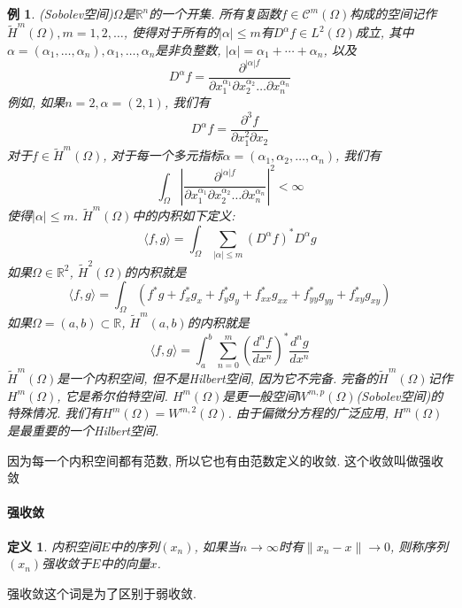 \documentclass[a4paper,11pt]{article}
\newtheorem{definition}{\hspace{2em}定义}[section]
\newtheorem{example}{例}[section]
\begin{document}
\begin{example}
  (Sobolev空间)$\Omega$是$\mathbb{R}^n$的一个开集. 所有复函数$f\in\mathcal{C}^m(\Omega)$构成的空间记作$\tilde{H}^m(\Omega),m=1,2,\dots$, 使得对于所有的$|\alpha|\leq m$有$D^\alpha f\in L^2(\Omega)$成立, 其中$\alpha=(\alpha_1,\dots,\alpha_n), \alpha_1,\dots,\alpha_n$是非负整数, $|\alpha|=\alpha_1+\cdots+\alpha_n$, 以及
  \begin{equation*}
    D^\alpha f=\frac{\partial^{|\alpha|f}}{\partial x_1^{\alpha_1}\partial x_2^{\alpha_2}\dots\partial x_n^{\alpha_n}}
  \end{equation*}
  例如, 如果$n=2,\alpha=(2,1)$, 我们有
  \begin{equation*}
    D^\alpha f=\frac{\partial^3 f}{\partial x_1^2\partial x_2}
  \end{equation*}
  对于$f\in\tilde{H}^m(\Omega)$, 对于每一个多元指标$\alpha=(\alpha_1,\alpha_2,\dots,\alpha_n)$, 我们有
  \begin{equation*}
    \int_{\Omega}|\frac{\partial^{|\alpha| f}}{\partial x_1^{\alpha_1}\partial x_2^{\alpha_2}\dots\partial x_n^{\alpha_n}}|^2<\infty
  \end{equation*}
  使得$|\alpha|\leq m$. $\tilde{H}^m(\Omega)$中的内积如下定义:
  \begin{equation*}
    \langle f,g\rangle=\int_{\Omega}\sum_{|\alpha|\leq m}(D^\alpha f)^*D^\alpha g
  \end{equation*}
  如果$\Omega\in \mathbb{R}^2$, $\tilde{H}^2(\Omega)$的内积就是
  \begin{equation*}
    \langle f,g\rangle=\int_{\Omega}(f^*g+f_x^*g_x+f_y^*g_y+f_{xx}^*g_{xx}+f_{yy}^*g_{yy}+f_{xy}^*g_{xy})
  \end{equation*}
  如果$\Omega=(a,b)\subset \mathbb{R}$, $\tilde{H}^m(a,b)$的内积就是
  \begin{equation*}
    \langle f,g\rangle=\int_{a}^{b}\sum_{n=0}^{m}(\frac{d^n f}{dx^n})^* \frac{d^n g}{dx^n}
  \end{equation*}
  $\tilde{H}^m(\Omega)$是一个内积空间, 但不是Hilbert空间, 因为它不完备. 完备的$\tilde{H}^m(\Omega)$记作$H^m(\Omega)$, 它是希尔伯特空间. $H^m(\Omega)$是更一般空间$W^{m,p}(\Omega)$(Sobolev空间)的特殊情况. 我们有$H^m(\Omega)=W^{m,2}(\Omega)$. 由于偏微分方程的广泛应用, $H^m(\Omega)$是最重要的一个Hilbert空间.
\end{example}
因为每一个内积空间都有范数, 所以它也有由范数定义的收敛. 这个收敛叫做强收敛
\paragraph*{强收敛}
\begin{definition}
  内积空间$E$中的序列$(x_n)$, 如果当$n\to\infty$时有$\|x_n-x\|\to 0$, 则称序列$(x_n)$强收敛于$E$中的向量$x$.
\end{definition}
强收敛这个词是为了区别于弱收敛.
\end{document}
